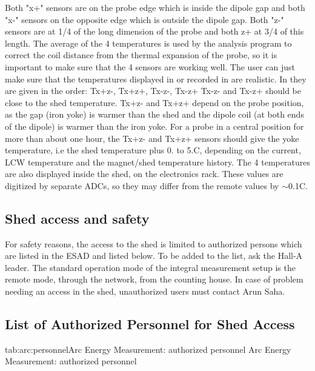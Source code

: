 {Both "x+" sensors are on the probe edge which is inside the
dipole gap and both "x-" sensors on the opposite edge which
is outside the dipole gap. Both "z-" sensors are at 1/4 of
the long dimension of the probe and both z+ at 3/4 of this length. The average
of the 4 temperatures is used by the analysis program to correct the coil distance
from the thermal expansion of the probe, so it is important to make sure that
the 4 sensors are working well. The user can just make sure that the temperatures
displayed in  or recorded in 
are realistic. In  they are given in the
order: Tx+z-, Tx+z+, Tx-z-, Tx-z+ Tx-z- and Tx-z+ should be close to the shed
temperature. Tx+z- and Tx+z+ depend on the probe position, as the gap (iron
yoke) is warmer than the shed and the dipole coil (at both ends of the dipole)
is warmer than the iron yoke. For a probe in a central position for more than
about one hour, the Tx+z- and Tx+z+ sensors should give the yoke temperature,
i.e the shed temperature plus 0. to 5.C, depending on the current, LCW temperature
and the magnet/shed temperature history. The 4 temperatures are also displayed
inside the shed, on the electronics rack. These values are digitized by separate
ADCs, so they may differ from the remote values by \( \sim  \)0.1C. 

}

\begin{safetyen}{10}{10}
\section{Shed access and safety }

For safety reasons, the access to the shed is limited to authorized
persons which are listed in the ESAD and listed below. To be added to the list, 
ask the 
Hall-A leader. 
The standard
operation mode of the integral measurement setup is the remote mode, through
the network, from the counting house. In case of problem needing an access in
the shed, unauthorized users must contact Arun Saha.
\end{safetyen}

\begin{safetyen}{10}{10}
\section{List of Authorized Personnel for Shed Access}
\end{safetyen}

\begin{namestab}{tab:arc:personnel}{Arc Energy Measurement: authorized personnel}{%
                 Arc Energy Measurement: authorized personnel}
  \DouglasHiginbotham{}
  \MichaelTiefenback{}
  \YvesRoblin{}
  \RickGonzales{}
  \BillMerz{}
  \MarkAugustine{}
  \HariAreti{}
  \PeteFrancis{}
  \ScottHiggins{}
  \DavidSeidman{}
  \RonLauze{}
  \TonyDay{}
  \PascalVernin{}
  \ChristianVeyssiere{}
  \FrancoisGougnaud{}
  \JacquesMarroncle{}
\end{namestab}


